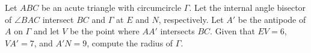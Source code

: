 Let $ABC$ be an acute triangle with circumcircle $\Gamma$. Let the internal angle bisector of $\angle BAC$ intersect $BC$ and $\Gamma$ at $E$ and $N$,  respectively. Let $A'$ be the antipode of $A$ on $\Gamma$ and let $V$ be the point where $AA'$ intersects $BC$. Given that $EV=6$,  $VA'=7$,  and $A'N=9$,  compute the radius of $\Gamma$.